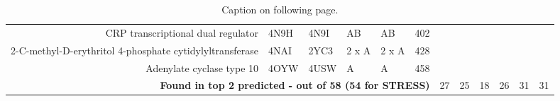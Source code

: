 \begin{table}
\begin{scriptsize}
\begin{tabular}{ r p{0.8cm} p{0.8cm} p{0.8cm} p{0.8cm} r r r r r r r }
\multicolumn{1}{r}{CRP transcriptional dual regulator} & \multicolumn{1}{l}{4N9H} & \multicolumn{1}{l}{4N9I} & \multicolumn{1}{l}{AB} & \multicolumn{1}{l}{AB} & 402   & \cellcolor[rgb]{ .573,  .816,  .314}  & \cellcolor[rgb]{ .573,  .816,  .314}  & \cellcolor[rgb]{ .573,  .816,  .314}  & \cellcolor[rgb]{ .573,  .816,  .314}  & \cellcolor[rgb]{ .573,  .816,  .314}  & \cellcolor[rgb]{ .573,  .816,  .314}  \\
\multicolumn{1}{r}{2-C-methyl-D-erythritol 4-phosphate cytidylyltransferase} & \multicolumn{1}{l}{4NAI} & \multicolumn{1}{l}{2YC3} & \multicolumn{1}{l}{2 x A} & \multicolumn{1}{l}{2 x A} & 428   & \cellcolor[rgb]{ 1,  .494,  .475}  & \cellcolor[rgb]{ 1,  .494,  .475}  & \cellcolor[rgb]{ 1,  .494,  .475}  & \cellcolor[rgb]{ 1,  .494,  .475}  & \cellcolor[rgb]{ 1,  .494,  .475}  & \cellcolor[rgb]{ .573,  .816,  .314}  \\
\multicolumn{1}{r}{Adenylate cyclase type 10} & \multicolumn{1}{l}{4OYW} & \multicolumn{1}{l}{4USW} & \multicolumn{1}{l}{A} & \multicolumn{1}{l}{A} & 458   & \cellcolor[rgb]{ 1,  .494,  .475}  & \cellcolor[rgb]{ 1,  .494,  .475}  & \cellcolor[rgb]{ 1,  .494,  .475}  & \cellcolor[rgb]{ 1,  .494,  .475}  & \cellcolor[rgb]{ .573,  .816,  .314}  & \cellcolor[rgb]{ .573,  .816,  .314}  \\
\hline
\multicolumn{6}{r}{\textbf{Found in top 2 predicted - out of 58 (54 for STRESS)}} & 27    & 25    & 18    & 26    & 31    & 31 \\
\hline
\end{tabular}
\end{scriptsize}

\caption[Performance of allosteric site prediction methods on a dataset of 58 known allosteric proteins - detail]
{Caption on following page.}

\label{tab:allosteric_proteins}
\end{table}

\begin{table}


\end{table}


